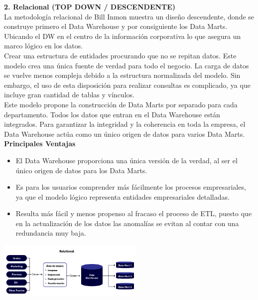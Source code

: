 \documentclass[twoside,twocolumn]{article}
\begin{document}
\noindent\textbf{\large 2. Relacional (TOP DOWN / DESCENDENTE)}\\[0.1in]
La metodología relacional de Bill Inmon muestra un diseño descendente, donde se construye primero el Data Warehouse y por consiguiente los Data Marts. Ubicando el DW en el centro de la información corporativa lo que asegura un marco lógico en los datos.\\[0.1in]
Crear una estructura de entidades procurando que no se repitan datos.  Este modelo crea una única fuente de verdad para todo el negocio. La carga de datos se vuelve menos compleja debido a la estructura normalizada del modelo. Sin embargo, el uso de esta disposición para realizar consultas es complicado, ya que incluye gran cantidad de tablas y vínculos.\\[0.1in]
Este modelo propone la construcción de Data Marts por separado para cada departamento. Todos los datos que entran en el Data Warehouse están integrados. Para garantizar la integridad y la coherencia en toda la empresa, el Data Warehouse actúa como un único origen de datos para varios Data Marts.\\[0.1in]
\textbf{Principales Ventajas}
\begin{itemize}
    \item El Data Warehouse proporciona una única versión de la verdad, al ser el único origen de datos para los Data Marts.
    \item Es para los usuarios comprender más fácilmente los procesos empresariales, ya que el modelo lógico representa entidades empresariales detalladas.
    \item Resulta más fácil y menos propenso al fracaso el proceso de ETL, puesto que en la actualización de los datos las anomalías se evitan al contar con una redundancia muy baja.
\end{itemize}
\begin{center}
    \includegraphics[width=7cm]{./img/img5.png}
\end{center}
\end{document}
